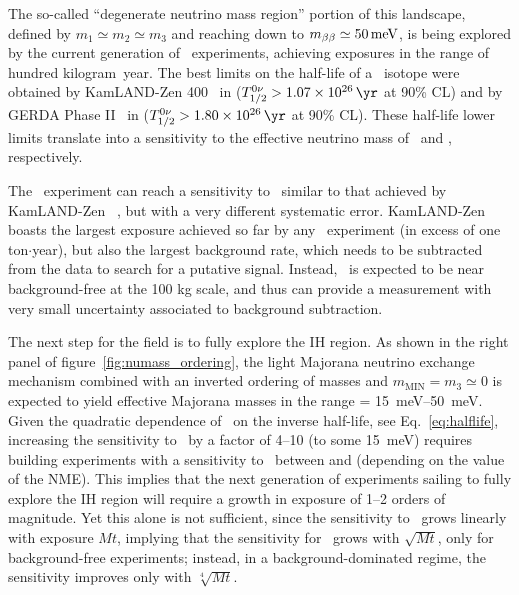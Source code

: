 The so-called ``degenerate neutrino mass region'' portion of this landscape, defined by $m_1\simeq m_2\simeq m_3$ and reaching down to $\mbb \simeq \SI{50}{\meV}$, is being explored by the current generation of \bbonu\ experiments, achieving exposures in the range of hundred kilogram~year. 
The best limits on the half-life of a \bbonu\ isotope were obtained by KamLAND-Zen 400~\cite{KamLAND-Zen:2016pfg} in  ($\Tonu > \KZenTz$ at 90\% CL) and by GERDA Phase II~\cite{GERDA:2020xhi} in  ($\Tonu > \GerdaTz$ at 90\% CL). These half-life lower limits translate into a sensitivity to the effective neutrino mass of \KZenMbb\ and \GerdaMbb, respectively. 

\indent

The \Next\ experiment can reach a sensitivity to \Tonu\ similar to that achieved by  KamLAND-Zen ~\cite{Martin-Albo:2015rhw}, but with a very different systematic error. KamLAND-Zen boasts the largest exposure achieved so far by any \bbonu\ experiment (in excess of one ton$\cdot$year), but also the largest background rate, which needs to be subtracted from the data to search for a putative signal. Instead, \Next\ is expected to be near background-free at the 100 kg scale, and thus can provide a measurement with very small uncertainty associated to background subtraction. 
 
The next step for the field is to fully explore the IH region. As shown in the right panel of figure~\ref{fig:numass_ordering}, the light Majorana neutrino exchange mechanism combined with an inverted ordering of masses and $m_\mathrm{MIN}=m_3\simeq 0$ is expected to yield effective Majorana masses in the range \mbb = \SIrange{15}{50}{\meV}. Given the quadratic dependence of \mbb\ on the inverse half-life, see Eq.~\ref{eq:halflife}, increasing the sensitivity to \mbb\ by a factor of 4--10 (to some \SI{15}{\meV}) requires building experiments with a sensitivity to \Tonu\ between \IHTzl \; and  \IHTz \;  (depending on the value of the NME). This implies that the next generation of experiments sailing to fully explore the IH region will require a growth in exposure of 1--2 orders of magnitude.  Yet this alone is not sufficient, since the sensitivity to \Tonu\ grows linearly with exposure $Mt$, implying that the sensitivity for \mbb\ grows with $\sqrt{Mt}$, only for background-free experiments; instead, in a background-dominated regime, the sensitivity improves only with $\sqrt[4]{Mt}$.

